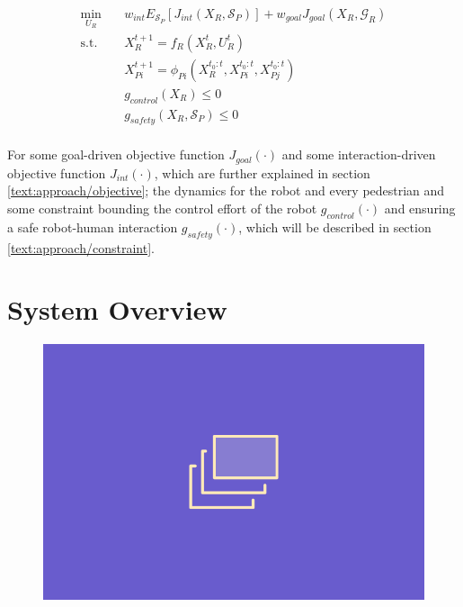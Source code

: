 \begin{align}
\min_{U_R} \quad & w_{int} E_{\mathcal{S}_P}[J_{int}(X_R, \mathcal{S}_P)] + w_{goal} J_{goal}(X_R, \mathcal{G}_R) \\
\textrm{s.t. } \quad & X_R^{t+1} = f_R(X_R^t, U_R^t) \\
& X_{Pi}^{t+1} = \phi_{Pi}(X_R^{t_0:t}, X_{Pi}^{t_0:t}, X_{Pj}^{t_0:t}) \\
& g_{control}(X_R) \leq 0 \\
& g_{safety}(X_R, \mathcal{S}_P) \leq 0 \\
\label{eq:formulation}
\end{align} 

For some goal-driven objective function $J_{goal}(\cdot)$ and some interaction-driven objective function $J_{int}(\cdot)$, which are further explained in section \ref{text:approach/objective}; the dynamics for the robot and every pedestrian and some constraint bounding the control effort of the robot $g_{control}(\cdot)$ and ensuring a safe robot-human interaction $g_{safety}(\cdot)$, which will be described in section \ref{text:approach/constraint}.

\section{System Overview}
\label{text:approach/overview}

\begin{figure}[!ht]
\begin{center}
\includegraphics[width=\imgwidth]{images/placeholder.png}
\label{img:information_flow}
\end{center}
\end{figure}

